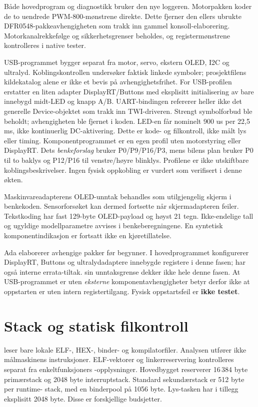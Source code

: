 Både hovedprogram og diagnostikk bruker den nye loggeren. Motorpakken
koder de to uendrede PWM-800-mønstrene direkte. Dette fjerner den ellers
ubrukte DFR0548-pakkeavhengigheten som trakk inn gammel konsoll-elaborering.
Motorkanalrekkefølge og sikkerhetsgrenser beholdes, og registermønstrene
kontrolleres i native tester.

USB-programmet bygger separat fra motor, servo, ekstern OLED, I2C og
ultralyd. Koblingskontrollen undersøker faktisk linkede symboler;
prosjektfilens kildekatalog alene er ikke et bevis på avhengighetsfrihet.
For USB-profilen erstatter en liten adapter DisplayRT/Buttons med
eksplisitt initialisering av bare innebygd midt-LED og knapp A/B. UART-bindingen
refererer heller ikke det generelle Device-objektet som trakk inn
TWI-driveren. Strengt symbolforbud ble beholdt; avhengigheten ble fjernet
i koden. LED-en får nominelt 900 us per 22,5 ms, ikke kontinuerlig
DC-aktivering. Dette er kode- og filkontroll, ikke målt lys eller timing.
Komponentprogrammet er en egen profil uten motorstyring eller DisplayRT.
Dets \emph{benkeforslag} bruker P0/P9/P16/P3, mens bilens plan bruker
P0 til to baklys og P12/P16 til venstre/høyre blinklys. Profilene er ikke
utskiftbare koblingsbeskrivelser. Ingen fysisk oppkobling er vurdert som
verifisert i denne økten.

Maskinvareadapterens OLED-unntak behandles som utilgjengelig skjerm i
benkekoden. Sensorforsøket kan dermed fortsette når skjermadapteren feiler.
Tekstkoding har fast 129-byte OLED-payload og høyst 21 tegn.
Ikke-endelige tall og ugyldige modellparametre avvises i benkeberegningene.
En syntetisk komponentindikasjon er fortsatt ikke en kjøretillatelse.

Ada elaborerer avhengige pakker før  begynner. I hovedprogrammet konfigurerer DisplayRT,
Buttons og ultralydadaptere innebygde registere i denne fasen;
 har også interne errata-tiltak.  sin
unntaksgrense dekker ikke hele denne fasen. At USB-programmet er uten
\emph{eksterne} komponentavhengigheter betyr derfor ikke at oppstarten er
uten intern registertilgang. Fysisk oppstartsfeil er \textbf{ikke testet}.

\section{Stack og statisk filkontroll}
 leser bare lokale ELF-, HEX-, binder- og
kompilatorfiler. Analysen utfører ikke målmaskinens instruksjoner.
ELF-vektorer og linkerreservering kontrolleres separat fra enkeltfunksjoners
-opplysninger. Hovedbygget reserverer 16\,384 byte primærstack og
2048 byte interruptstack. Standard sekundærstack er 512 byte per runtime-
stack, med en binderpool på 1056 byte. Lys-tasken har i tillegg eksplisitt
2048 byte. Disse er forskjellige budsjetter.

